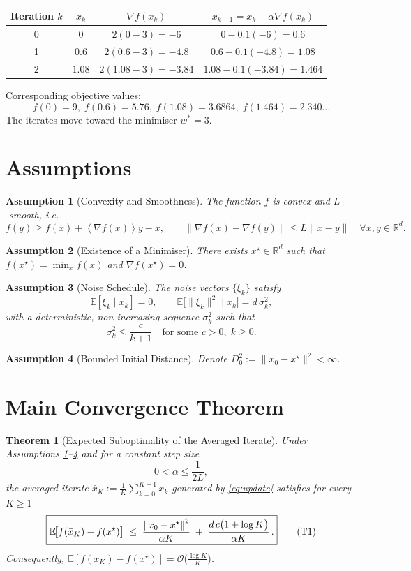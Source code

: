 \documentclass[11pt]{article}
\newtheorem{theorem}{Theorem}
\newtheorem{assumption}{Assumption}
\newcommand{\EE}{\mathbb{E}}
\newcommand{\RR}{\mathbb{R}}
\newcommand{\norm}[1]{\left\lVert #1\right\rVert}
\newcommand{\inner}[1]{\left\langle #1\right\rangle}
\begin{document}
\begin{center}
\begin{tabular}{c|c|c|c}
Iteration $k$ & $x_{k}$ & $\nabla f(x_{k})$ & $x_{k+1}=x_{k}-\alpha\nabla f(x_{k})$ \\ \hline
0 & $0$ & $2(0-3)=-6$ & $0-0.1(-6)=0.6$ \\
1 & $0.6$ & $2(0.6-3)=-4.8$ & $0.6-0.1(-4.8)=1.08$ \\
2 & $1.08$ & $2(1.08-3)=-3.84$ & $1.08-0.1(-3.84)=1.464$ \\
\end{tabular}
\end{center}
Corresponding objective values:
\[
f(0)=9,\; f(0.6)=5.76,\; f(1.08)=3.6864,\; f(1.464)=2.340\ldots
\]
The iterates move toward the minimiser $w^{*}=3$.

\newpage
\section*{Assumptions}
\begin{assumption}[Convexity and Smoothness]\label{ass:convex-smooth}
The function $f$ is convex and $L$‑smooth, i.e.
\[
f(y)\ge f(x)+\inner{\nabla f(x)}{y-x},\qquad 
\|\nabla f(x)-\nabla f(y)\|\le L\|x-y\|\quad\forall x,y\in\RR^{d}.
\]
\end{assumption}
\begin{assumption}[Existence of a Minimiser]\label{ass:opt}
There exists $x^{\star}\in\RR^{d}$ such that $f(x^{\star})=\min_{x}f(x)$ and $\nabla f(x^{\star})=0$.
\end{assumption}
\begin{assumption}[Noise Schedule]\label{ass:noise}
The noise vectors $\{\xi_{k}\}$ satisfy  
\[
\EE[\xi_{k}\mid x_{k}]=0,\qquad
\EE\big[\|\xi_{k}\|^{2}\mid x_{k}\big]=d\,\sigma_{k}^{2},
\]
with a deterministic, non‑increasing sequence $\sigma_{k}^{2}$ such that
\[
\sigma_{k}^{2}\le \frac{c}{k+1}\quad\text{for some }c>0,\;k\ge0.
\tag{A3}
\]
\end{assumption}
\begin{assumption}[Bounded Initial Distance]\label{ass:init}
Denote $D_{0}^{2}:=\|x_{0}-x^{\star}\|^{2}<\infty$.
\end{assumption}

\section*{Main Convergence Theorem}
\begin{theorem}[Expected Suboptimality of the Averaged Iterate]\label{thm:main}
Under Assumptions \ref{ass:convex-smooth}–\ref{ass:init} and for a constant step size
\[
0<\alpha\le\frac{1}{2L},
\]
the averaged iterate $\displaystyle \bar{x}_{K}:=\frac{1}{K}\sum_{k=0}^{K-1}x_{k}$
generated by \eqref{eq:update} satisfies for every $K\ge1$
\[
\boxed{%
\EE\!\big[f(\bar{x}_{K})-f(x^{\star})\big]\;\le\;
\frac{\norm{x_{0}-x^{\star}}^{2}}{\alpha K}
\;+\;
\frac{d\,c\big(1+\log K\big)}{\alpha K}\,.
}
\tag{T1}
\]
Consequently, $\EE[f(\bar{x}_{K})-f(x^{\star})]=\mathcal O\!\big(\tfrac{\log K}{K}\big)$.
\end{theorem}
\end{document}
